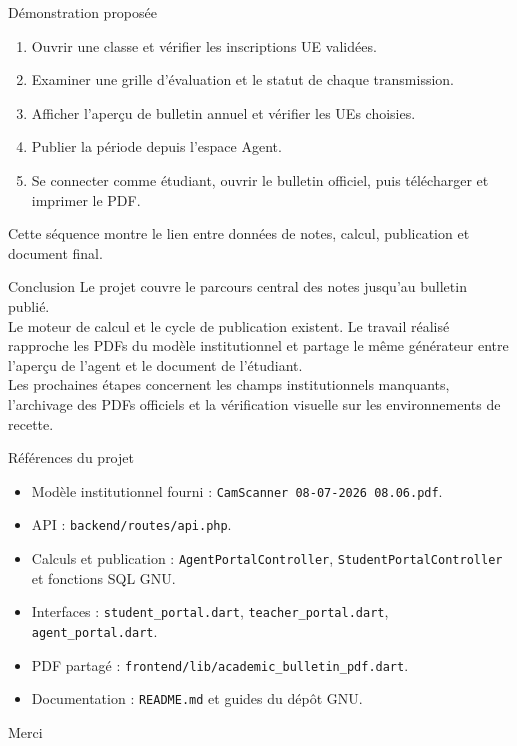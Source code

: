 \documentclass[aspectratio=169,12pt]{beamer}
\begin{document}
\begin{frame}{Démonstration proposée}
  \begin{enumerate}
    \item Ouvrir une classe et vérifier les inscriptions UE validées.
    \item Examiner une grille d’évaluation et le statut de chaque transmission.
    \item Afficher l’aperçu de bulletin annuel et vérifier les UEs choisies.
    \item Publier la période depuis l’espace Agent.
    \item Se connecter comme étudiant, ouvrir le bulletin officiel, puis télécharger et imprimer le PDF.
  \end{enumerate}
  \vspace{.7em}
  \small Cette séquence montre le lien entre données de notes, calcul, publication et document final.
\end{frame}

\begin{frame}{Conclusion}
  \Large Le projet couvre le parcours central des notes jusqu’au bulletin publié.\\[.9em]
  \normalsize
  Le moteur de calcul et le cycle de publication existent. Le travail réalisé rapproche les PDFs du modèle institutionnel et partage le même générateur entre l’aperçu de l’agent et le document de l’étudiant.\\[.9em]
  Les prochaines étapes concernent les champs institutionnels manquants, l’archivage des PDFs officiels et la vérification visuelle sur les environnements de recette.
\end{frame}

\begin{frame}{Références du projet}
  \begin{itemize}
    \item Modèle institutionnel fourni : \texttt{CamScanner 08-07-2026 08.06.pdf}.
    \item API : \texttt{backend/routes/api.php}.
    \item Calculs et publication : \texttt{AgentPortalController}, \texttt{StudentPortalController} et fonctions SQL GNU.
    \item Interfaces : \texttt{student\_portal.dart}, \texttt{teacher\_portal.dart}, \texttt{agent\_portal.dart}.
    \item PDF partagé : \texttt{frontend/lib/academic\_bulletin\_pdf.dart}.
    \item Documentation : \texttt{README.md} et guides du dépôt GNU.
  \end{itemize}
  \vfill
  \centering\color{GNUteal}\large Merci
\end{frame}
\end{document}
